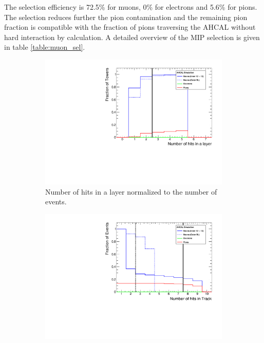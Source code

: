 The selection efficiency is 72.5\% for muons, 0\% for electrons and 5.6\% for pions. The selection reduces further the pion contamination and the remaining pion fraction is compatible with the fraction of pions traversing the AHCAL without hard interaction by calculation. A detailed overview of the MIP selection is given in table \ref{table:muon_sel}.

\begin{figure}[htbp!]
	\begin{subfigure}[t]{0.5\textwidth}
		\centering
		\includegraphics[width=1\linewidth]{../Thesis_Plots/Timing/Muons/Plots/TrackFinderCut_nHitsLayer_Muons}
		\caption{Number of hits in a layer normalized to the number of events.} \label{fig:Muons_Track_nHitsLayer}
	\end{subfigure}
	\hfill
	\begin{subfigure}[t]{0.5\textwidth}
		\centering
		\includegraphics[width=1\linewidth]{../Thesis_Plots/Timing/Muons/Plots/TrackFinderCut_nHitsTrack_Muons}

\end{subfigure}
\end{figure}
